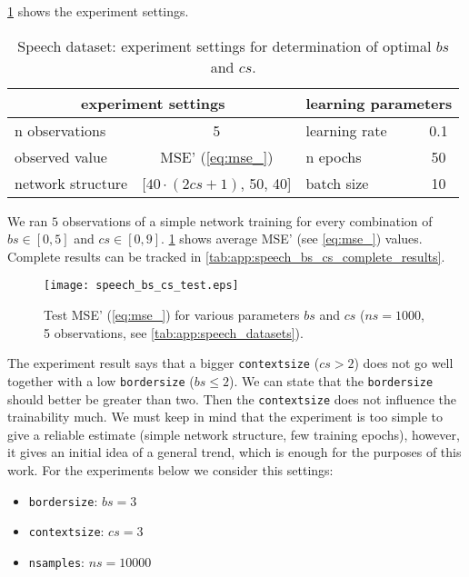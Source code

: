 \cref{tab:examples:speech_bs_cs_determination} shows the experiment settings.

\begin{table}[H]
\centering
\begin{tabular}{|l|c|l|c|}
\hline
\multicolumn{2}{|c|}{experiment settings}   & \multicolumn{2}{c|}{learning parameters} \\ \hline
n observations    & 5                       & learning rate            & 0.1           \\ \hline
observed value    & MSE' (\cref{eq:mse_})    & n epochs                 & 50            \\ \hline
network structure & {[}$ 40 \cdot (2cs+1) $, 50, 40{]} & batch size               & 10            \\ \hline
\end{tabular}
\caption{Speech dataset: experiment settings for determination of optimal $ bs $ and $ cs $.}
\label{tab:examples:speech_bs_cs_determination}
\end{table}

We ran $ 5 $ observations of a simple network training for every combination of $ bs \in [0, 5] $ and $ cs \in [0, 9] $. \cref{fig:examples:speech_bs_cs_test} shows average MSE' (see \cref{eq:mse_}) values. Complete results can be tracked in \cref{tab:app:speech_bs_cs_complete_results}.

\begin{figure}[H]
\centering
\texttt{[image: speech\_bs\_cs\_test.eps]}
\caption{Test MSE' (\cref{eq:mse_}) for various parameters $ bs $ and $ cs $ ($ ns = 1000 $, 5 observations, see \cref{tab:app:speech_datasets}).}
\label{fig:examples:speech_bs_cs_test}
\end{figure}

The experiment result says that a bigger \texttt{context\textunderscore size} ($ cs > 2 $) does not go well together with a low \texttt{border\textunderscore size} ($ bs \leq 2 $). We can state that the \texttt{border\textunderscore size} should better be greater than two. Then the \texttt{context\textunderscore size} does not influence the trainability much. We must keep in mind that the experiment is too simple to give a reliable estimate (simple network structure, few training epochs), however, it gives an initial idea of a general trend, which is enough for the purposes of this work. For the experiments below we consider this settings:

\begin{itemize}
\item \texttt{border\textunderscore size}: $ bs = 3 $
\item \texttt{context\textunderscore size}: $ cs = 3 $
\item \texttt{n\textunderscore samples}: $ ns = 10000 $
\end{itemize}

